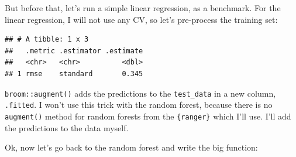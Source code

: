 \documentclass[]{gitbook}
\newenvironment{Shaded}{\begin{snugshade}}{\end{snugshade}}
\newcommand{\DataTypeTok}[1]{\textcolor[rgb]{0.13,0.29,0.53}{#1}}
\newcommand{\KeywordTok}[1]{\textcolor[rgb]{0.13,0.29,0.53}{\textbf{#1}}}
\newcommand{\NormalTok}[1]{#1}
\newcommand{\OperatorTok}[1]{\textcolor[rgb]{0.81,0.36,0.00}{\textbf{#1}}}
\newcommand{\StringTok}[1]{\textcolor[rgb]{0.31,0.60,0.02}{#1}}
\theoremstyle{definition}
\theoremstyle{definition}
\theoremstyle{definition}
\theoremstyle{remark}
\begin{document}
But before that, let's run a simple linear regression, as a benchmark.
For the linear regression, I will not use any CV, so let's pre-process
the training set:

\begin{Shaded}
\end{Shaded}

\begin{verbatim}
## # A tibble: 1 x 3
##   .metric .estimator .estimate
##   <chr>   <chr>          <dbl>
## 1 rmse    standard       0.345
\end{verbatim}

\texttt{broom::augment()} adds the predictions to the
\texttt{test\_data} in a new column, \texttt{.fitted}. I won't use this
trick with the random forest, because there is no \texttt{augment()}
method for random forests from the \texttt{\{ranger\}} which I'll use.
I'll add the predictions to the data myself.

Ok, now let's go back to the random forest and write the big function:
\end{document}

